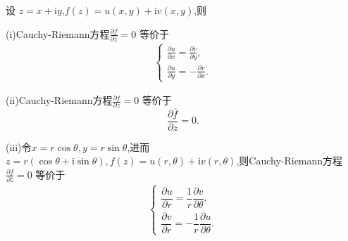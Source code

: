 \documentclass[../../main.tex]{subfiles}%
\begin{document}
\begin{theorem}\label{theorem:Cauchy-Riemann方程的等价定义}
设 $z=x+\mathrm{i}y$,$f(z) = u(x,y) + \mathrm{i}v(x,y)$,则

(i)Cauchy-Riemann方程$\frac{\partial f}{\partial \overline{z}} = 0$ 等价于
\begin{align}\label{equation:--2.5}
\begin{cases}
\frac{\partial u}{\partial x}=\frac{\partial v}{\partial y},\\
\frac{\partial u}{\partial y}=-\frac{\partial v}{\partial x}.
\end{cases}
\end{align}

(ii)Cauchy-Riemann方程$\frac{\partial f}{\partial \overline{z}} = 0$ 等价于
$$
\frac{\partial \overline{f}}{\partial z}=0.
$$

(iii)令$x=r\cos \theta ,y=r\sin \theta $,进而$z=r(\cos\theta+\mathrm{i}\sin\theta),f(z) = u(r,\theta) + \mathrm{i}v(r,\theta)$,则Cauchy-Riemann方程$\frac{\partial f}{\partial \overline{z}} = 0$ 等价于
\begin{align*}
\begin{cases}
\dfrac{\partial u}{\partial r} = \dfrac{1}{r} \dfrac{\partial v}{\partial \theta}, \\
\dfrac{\partial v}{\partial r} = -\dfrac{1}{r} \dfrac{\partial u}{\partial \theta}.
\end{cases}
\end{align*}
\end{theorem}
\end{document}
